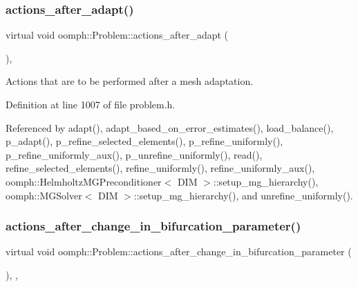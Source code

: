 \subsubsection{\texorpdfstring{actions\+\_\+after\+\_\+adapt()}{actions\_after\_adapt()}}
{\footnotesize\ttfamily virtual void oomph\+::\+Problem\+::actions\+\_\+after\+\_\+adapt (\begin{DoxyParamCaption}{ }\end{DoxyParamCaption})\hspace{0.3cm}{\ttfamily [inline]}, {\ttfamily [virtual]}}



Actions that are to be performed after a mesh adaptation. 



Definition at line 1007 of file problem.\+h.



Referenced by adapt(), adapt\+\_\+based\+\_\+on\+\_\+error\+\_\+estimates(), load\+\_\+balance(), p\+\_\+adapt(), p\+\_\+refine\+\_\+selected\+\_\+elements(), p\+\_\+refine\+\_\+uniformly(), p\+\_\+refine\+\_\+uniformly\+\_\+aux(), p\+\_\+unrefine\+\_\+uniformly(), read(), refine\+\_\+selected\+\_\+elements(), refine\+\_\+uniformly(), refine\+\_\+uniformly\+\_\+aux(), oomph\+::\+Helmholtz\+M\+G\+Preconditioner$<$ D\+I\+M $>$\+::setup\+\_\+mg\+\_\+hierarchy(), oomph\+::\+M\+G\+Solver$<$ D\+I\+M $>$\+::setup\+\_\+mg\+\_\+hierarchy(), and unrefine\+\_\+uniformly().

\mbox{\label{classoomph_1_1Problem_a5f08629e3c9c72b441ec7f19f175b2c7}} 
\subsubsection{\texorpdfstring{actions\+\_\+after\+\_\+change\+\_\+in\+\_\+bifurcation\+\_\+parameter()}{actions\_after\_change\_in\_bifurcation\_parameter()}}
{\footnotesize\ttfamily virtual void oomph\+::\+Problem\+::actions\+\_\+after\+\_\+change\+\_\+in\+\_\+bifurcation\+\_\+parameter (\begin{DoxyParamCaption}{ }\end{DoxyParamCaption})\hspace{0.3cm}{\ttfamily [inline]}, {\ttfamily [protected]}, {\ttfamily [virtual]}}



